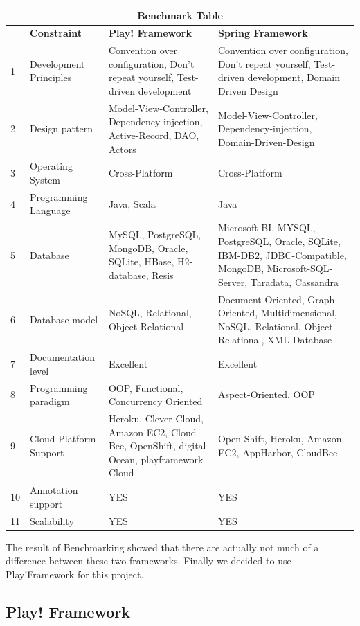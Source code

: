 \begin{center}
	

\begin{tabular}{ |l||l|p{6cm}|p{6cm}|  }
 \hline
 \multicolumn{4}{|c|}{\textbf{Benchmark Table}} \\
 \hline
 ~ & \textbf{Constraint} & \textbf{Play! Framework} & \textbf{Spring Framework}\\
 \hline
 1 & Development Principles & Convention over configuration, Don't repeat yourself, Test-driven development & Convention over configuration, Don't repeat yourself, Test-driven development, Domain Driven Design \\
 \hline
 2 & Design pattern & Model-View-Controller, Dependency-injection, Active-Record, DAO, Actors & Model-View-Controller, Dependency-injection, Domain-Driven-Design \\
 \hline
 3 & Operating System & Cross-Platform & Cross-Platform \\
 \hline
 4 & Programming Language & Java, Scala & Java \\
 \hline
 5 & Database & MySQL, PostgreSQL, MongoDB, Oracle, SQLite, HBase, H2-database, Resis & Microsoft-BI, MYSQL, PostgreSQL, Oracle, SQLite, IBM-DB2, JDBC-Compatible, MongoDB, Microsoft-SQL-Server, Taradata, Cassandra \\
 \hline
 6 & Database model & NoSQL, Relational, Object-Relational & Document-Oriented, Graph-Oriented, Multidimensional, NoSQL, Relational, Object-Relational, XML Database \\
 \hline
 7 & Documentation level & Excellent&Excellent \\
 \hline
 8 & Programming paradigm & OOP, Functional, Concurrency Oriented&Aspect-Oriented, OOP \\
 \hline
 9 & Cloud Platform Support & Heroku, Clever Cloud, Amazon EC2, Cloud Bee, OpenShift, digital Ocean, playframework Cloud & Open Shift, Heroku, Amazon EC2, AppHarbor, CloudBee \\
 \hline
 10 & Annotation support & YES & YES \\
 \hline
 11 & Scalability & YES & YES \\
 \hline
\end{tabular}
\end{center}

The result of Benchmarking showed that there are actually not much of a difference between these two frameworks. Finally we decided to use Play!Framework for this project.

\subsection{Play! Framework}
  



